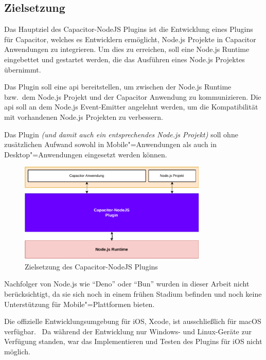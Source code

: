 \subsection{Zielsetzung}

Das Hauptziel des Capacitor-NodeJS Plugins ist die Entwicklung eines Plugins für Capacitor, welches es Entwicklern ermöglicht, Node.js Projekte in Capacitor Anwendungen zu integrieren.
Um dies zu erreichen, soll eine Node.js Runtime eingebettet und gestartet werden, die das Ausführen eines Node.js Projektes übernimmt.

Das Plugin soll eine \ac{api} bereitstellen, um zwischen der Node.js Runtime bzw.\ dem Node.js Projekt und der Capacitor Anwendung zu kommunizieren.
Die \ac{api} soll an dem Node.js Event-Emitter angelehnt werden, um die Kompatibilität mit vorhandenen Node.js Projekten zu verbessern.

Das Plugin \textit{(und damit auch ein entsprechendes Node.js Projekt)} soll ohne zusätzlichen Aufwand sowohl in Mobile"=Anwendungen als auch in Desktop"=Anwendungen eingesetzt werden können.

\vspace{1em}

\begin{figure}[h]
    \centering
    \includegraphics[width=0.8\textwidth]{assets/02_Capacitor-NodeJS/01_Zielsetzung.drawio.pdf}
    \caption[Capacitor-NodeJS / Zielsetzung]{Zielsetzung des Capacitor-NodeJS Plugins}
\end{figure}

Nachfolger von Node.js wie \enquote{Deno} oder \enquote{Bun} wurden in dieser Arbeit nicht berücksichtigt, da sie sich noch in einem frühen Stadium befinden und noch keine Unterstützung für Mobile"=Plattformen bieten.
\cite{deno, bun}

\begin{note}
    Die offizielle Entwicklungsumgebung für iOS, Xcode, ist ausschließlich für macOS verfügbar.~\cite{xcode:support}
    Da während der Entwicklung nur Windows- und Linux-Geräte zur Verfügung standen, war das Implementieren und Testen des Plugins für iOS nicht möglich.
\end{note}
